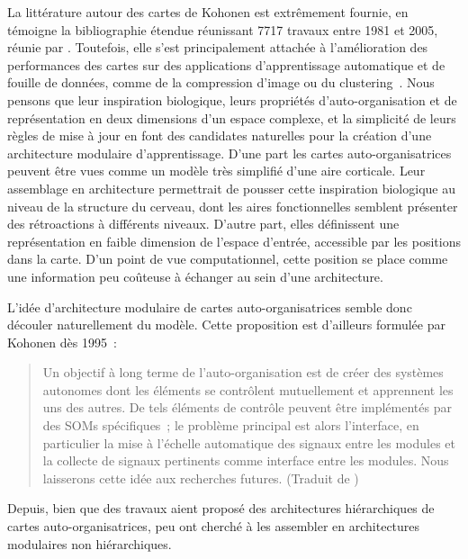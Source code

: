 La littérature autour des cartes de Kohonen est extrêmement fournie, en témoigne la bibliographie étendue réunissant 7717 travaux entre 1981 et 2005, réunie par \cite{Kaski1998BibliographyOS,oja_bibliography_2002,Honkela2009BIBLIOGRAPHYOS}.
Toutefois, elle s'est principalement attachée à l'amélioration des performances des cartes sur des applications d'apprentissage automatique et de fouille de données, comme de la compression d'image ou du clustering~\parencite{kohonen_essentials_2013}.
Nous pensons que leur inspiration biologique, leurs propriétés d'auto-organisation et de représentation en deux dimensions d'un espace complexe, et la simplicité de leurs règles de mise à jour en font des candidates naturelles pour la création d'une architecture modulaire d'apprentissage.
D'une part les cartes auto-organisatrices peuvent être vues comme un modèle très simplifié d'une aire corticale. Leur assemblage en architecture permettrait de pousser cette inspiration biologique au niveau de la structure du cerveau, dont les aires fonctionnelles semblent présenter des rétroactions à différents niveaux.
D'autre part, elles définissent une représentation en faible dimension de l'espace d'entrée, accessible par les positions dans la carte. D'un point de vue computationnel, cette position se place comme une information peu coûteuse à échanger au sein d'une architecture.

L'idée d'architecture modulaire de cartes auto-organisatrices semble donc découler naturellement du modèle. Cette proposition est d'ailleurs formulée par Kohonen dès 1995~:
\begin{quote}
\og Un objectif à long terme de l'auto-organisation est de créer des systèmes autonomes dont les éléments se contrôlent mutuellement et apprennent les uns des autres. De tels éléments de contrôle peuvent être implémentés par des SOMs spécifiques~; le problème principal est alors l'interface, en particulier la mise à l'échelle automatique des signaux entre les modules et la collecte de signaux pertinents comme interface entre les modules. Nous laisserons cette idée aux recherches futures. \fg{}
(Traduit de \cite{Kohonen1995SelfOrganizingM})
\end{quote}

Depuis, bien que des travaux aient proposé des architectures hiérarchiques de cartes auto-organisatrices, peu ont cherché à les assembler en architectures modulaires non hiérarchiques.

